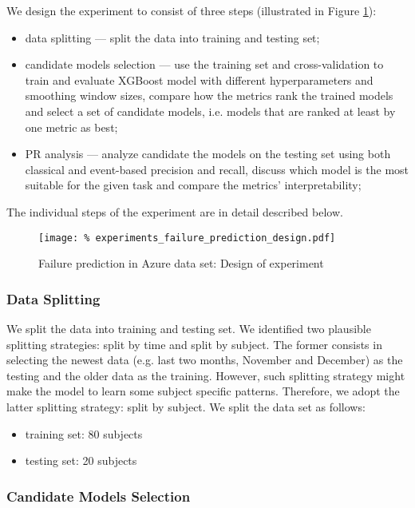 We design the experiment to consist of three steps (illustrated in Figure \ref{fig:experiments_failure_prediction_design}):
\begin{itemize}
    \item data splitting --- split the data into training and testing set;
    \item candidate models selection --- use the training set and cross-validation to train and evaluate XGBoost model with different hyperparameters and smoothing window sizes, compare how the metrics rank the trained models and select a set of candidate models, i.e. models that are ranked at least by one metric as best;
    \item PR analysis --- analyze candidate the models on the testing set using both classical and event-based precision and recall, discuss which model is the most suitable for the given task and compare the metrics' interpretability;
\end{itemize}
The individual steps of the experiment are in detail described below.

\begin{figure}[H]
    \centering
        \texttt{[image: \%
            experiments\_failure\_prediction\_design.pdf]}
    \caption{Failure prediction in Azure data set: Design of experiment}
    \label{fig:experiments_failure_prediction_design}
\end{figure}

\subsubsection{Data Splitting}

We split the data into training and testing set.
We identified two plausible splitting strategies: split by time and split by subject.
The former consists in selecting the newest data (e.g. last two months, November and December) as the testing and the older data as the training.
However, such splitting strategy might make the model to learn some subject specific patterns.
Therefore, we adopt the latter splitting strategy: split by subject.
We split the data set as follows:
\begin{itemize}
    \item training set: 80 subjects
    \item testing set: 20 subjects
\end{itemize}

\subsubsection{Candidate Models Selection}

